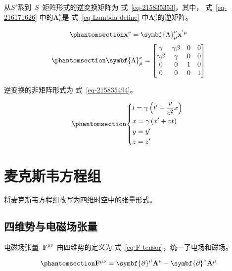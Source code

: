 \documentclass[
  chinese,
  a4paper,
  UTF8,
  12pt,
  oneside,
  openany]{ctexbook}
\begin{document}
从\(S'\)系到~\(S\)~矩阵形式的逆变换矩阵为 式~\ref{eq-215835353}，其中，
式~\ref{eq-216171626} 中的\(\symbf{\Lambda}_{\mu}^{\nu}\)是
式~\ref{eq-Lambda-define} 中\(\symbf{\Lambda}_{\nu}^{\mu}\)的逆矩阵。

\begin{equation}\protect\phantomsection\label{eq-215835353}{
\mathbf{x}^{v} = \symbf{\Lambda}_{\mu}^{\nu}\mathbf{x}^{'\mu}
}\end{equation}
\begin{equation}\protect\phantomsection\label{eq-216171626}{
\symbf{\Lambda}_{\mu}^{\nu} = \begin{bmatrix}
  \gamma & \gamma\beta & 0 & 0 \\
  \gamma\beta & \gamma & 0 & 0 \\
  0 & 0 & 1 & 0 \\
  0 & 0 & 0 & 1
  \end{bmatrix}
}\end{equation}

逆变换的非矩阵形式为 式~\ref{eq-215835494}。

\begin{equation}\protect\phantomsection\label{eq-215835494}{
\left\{ \begin{aligned}
   & t = \gamma\left( t' + \frac{v}{c^{2}}x \right) \\
   & x = \gamma\left( x' + vt \right) \\
   & y = y' \\
   & z = z'
  \end{aligned} \right.\
}\end{equation}

\section{麦克斯韦方程组}\label{ux9ea6ux514bux65afux97e6ux65b9ux7a0bux7ec4-1}

将麦克斯韦方程组改写为四维时空中的张量形式。

\subsection{四维势与电磁场张量}\label{ux56dbux7ef4ux52bfux4e0eux7535ux78c1ux573aux5f20ux91cf}

电磁场张量\textbf{~}\(\mathbf{F}^{\mu\nu}\)~由四维势的定义为
式~\ref{eq-F-tensor}，统一了电场和磁场。

\begin{equation}\protect\phantomsection\label{eq-F-tensor}{
\mathbf{F}^{\mu\nu} = \symbf{\partial}^{\mu}\mathbf{A}^{\nu} - \symbf{\partial}^{\nu}\mathbf{A}^{\mu}
}\end{equation}
\end{document}
